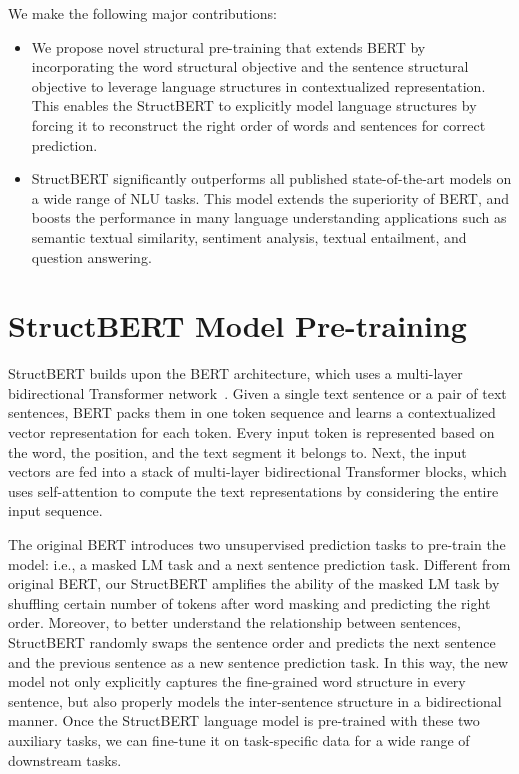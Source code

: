 \documentclass{article}
\begin{document}
We make the following major contributions:
\begin{itemize}
\item We propose novel structural pre-training that extends BERT by incorporating the word structural objective and the sentence structural objective to leverage language structures in contextualized representation. This enables the StructBERT to explicitly model language structures by forcing it to reconstruct the right order of words and sentences for correct prediction.
\item StructBERT significantly outperforms all published state-of-the-art models on a wide range of NLU tasks. This model extends the superiority of BERT, and boosts the performance in many language understanding applications such as semantic textual similarity, sentiment analysis, textual entailment, and question answering.
\end{itemize}

\section{StructBERT Model Pre-training}
StructBERT builds upon the BERT architecture, which uses a multi-layer bidirectional Transformer network~\cite{vaswani2017attention}. Given a single text sentence or a pair of text sentences, BERT packs them in one token sequence and learns a contextualized vector representation for each token. Every input token is represented based on the word, the position, and the text segment it belongs to. Next, the input vectors are fed into a stack of multi-layer bidirectional Transformer blocks, which uses self-attention to compute the text representations by considering the entire input sequence.

The original BERT introduces two unsupervised prediction tasks to pre-train the model: i.e., a masked LM task and a next sentence prediction task. Different from original BERT, our StructBERT amplifies the ability of the masked LM task by shuffling certain number of tokens after word masking and predicting the right order. Moreover, to better understand the relationship between sentences, StructBERT randomly swaps the sentence order and predicts the next sentence and the previous sentence as a new sentence prediction task. In this way, the new model not only explicitly captures the fine-grained word structure in every sentence, but also properly models the inter-sentence structure in a bidirectional manner. Once the StructBERT language model is pre-trained with these two auxiliary tasks, we can fine-tune it on task-specific data for a wide range of downstream tasks.
\end{document}
